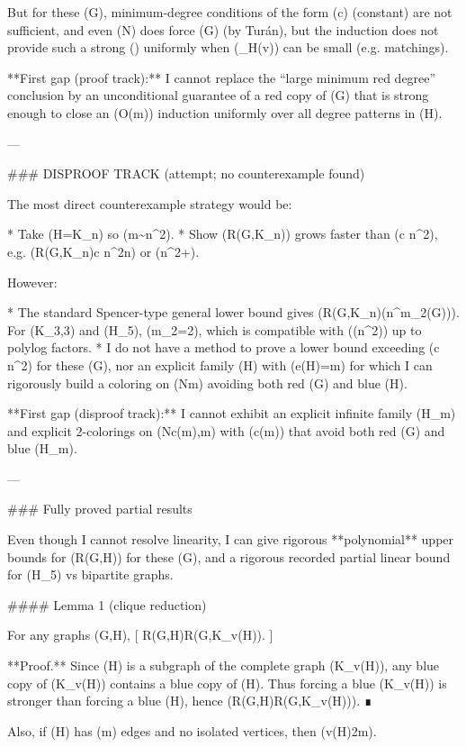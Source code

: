 But for these (G), minimum-degree conditions of the form (\delta\ge c) (constant) are not sufficient, and even (\delta\ge \alpha N) does force (G) (by Turán), but the induction does not provide such a strong (\alpha) uniformly when (\deg_H(v)) can be small (e.g. matchings).

**First gap (proof track):** I cannot replace the “large minimum red degree” conclusion by an unconditional guarantee of a red copy of (G) that is strong enough to close an (O(m)) induction uniformly over all degree patterns in (H).

---

### DISPROOF TRACK (attempt; no counterexample found)

The most direct counterexample strategy would be:

* Take (H=K_n) so (m\sim n^2).
* Show (R(G,K_n)) grows faster than (c n^2), e.g. (R(G,K_n)\ge c n^2\log n) or (n^{2+\varepsilon}).

However:

* The standard Spencer-type general lower bound gives (R(G,K_n)\gtrsim \tilde\Omega(n^{m_2(G)})). For (K_{3,3}) and (H_5), (m_2=2), which is compatible with (\Theta(n^2)) up to polylog factors.
* I do not have a method to prove a lower bound exceeding (c n^2) for these (G), nor an explicit family (H) with (e(H)=m) for which I can rigorously build a coloring on (N\gg m) avoiding both red (G) and blue (H).

**First gap (disproof track):** I cannot exhibit an explicit infinite family (H_m) and explicit 2-colorings on (N\ge c(m),m) with (c(m)\to\infty) that avoid both red (G) and blue (H_m).

---

### Fully proved partial results

Even though I cannot resolve linearity, I can give rigorous **polynomial** upper bounds for (R(G,H)) for these (G), and a rigorous recorded partial linear bound for (H_5) vs bipartite graphs.

#### Lemma 1 (clique reduction)

For any graphs (G,H),
[
R(G,H)\le R(G,K_{v(H)}).
]

**Proof.** Since (H) is a subgraph of the complete graph (K_{v(H)}), any blue copy of (K_{v(H)}) contains a blue copy of (H). Thus forcing a blue (K_{v(H)}) is stronger than forcing a blue (H), hence (R(G,H)\le R(G,K_{v(H)})). ∎

Also, if (H) has (m) edges and no isolated vertices, then (v(H)\le 2m).

